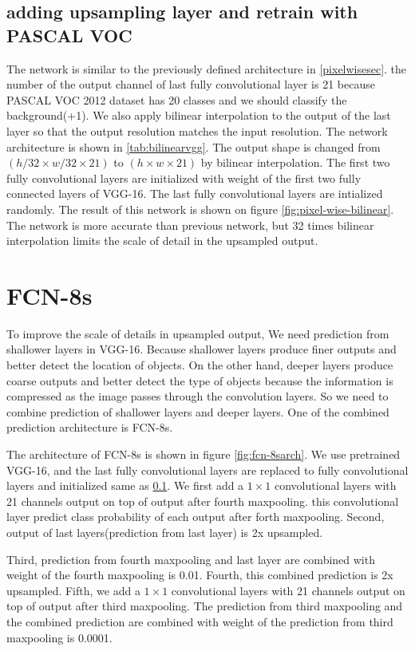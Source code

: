 \documentclass[extendedabs]{bmvc2k}
\begin{document}
\subsection{adding upsampling layer and retrain with PASCAL VOC} \label{addupsample}
The network is similar to the previously defined architecture in \ref{pixelwisesec}. the number of the output channel of last fully convolutional layer is 21 because PASCAL VOC 2012 dataset has 20 classes and we should classify the background(+1). We also apply bilinear interpolation to the output of the last layer so that the output resolution matches the input resolution. The network architecture is shown in \ref{tab:bilinearvgg}. The output shape is changed from $(h/32 \times w/32 \times 21)$ to $(h\times w\times 21)$ by bilinear interpolation. The first two fully convolutional layers are initialized with weight of the first two fully connected layers of VGG-16\cite{vggnet}. The last fully convolutional layers are intialized randomly. The result of this network is shown on figure \ref{fig:pixel-wise-bilinear}. The network is more accurate than previous network, but 32 times bilinear interpolation limits the scale of detail in the upsampled output.

\section{FCN-8s}
To improve the scale of details in upsampled output, We need prediction from shallower layers in VGG-16. Because shallower layers produce finer outputs and better detect the location of objects. On the other hand, deeper layers produce coarse outputs and better detect the type of objects because the information is compressed as the image passes through the convolution layers. So we need to combine prediction of shallower layers and deeper layers. One of the combined prediction architecture is FCN-8s.

The architecture of FCN-8s is shown in figure \ref{fig:fcn-8sarch}. We use pretrained VGG-16, and the last fully convolutional layers are replaced to fully convolutional layers and initialized same as \ref{addupsample}. We first add a $1\times1$ convolutional layers with 21 channels output on top of output after fourth maxpooling. this convolutional layer predict class probability of each output after forth maxpooling. Second, output of last layers(prediction from last layer) is 2x upsampled.

Third, prediction from fourth maxpooling and last layer are combined with weight of the fourth maxpooling is 0.01. Fourth, this combined prediction is 2x upsampled. Fifth, we add a $1\times1$ convolutional layers with 21 channels output on top of output after third maxpooling. The prediction from third maxpooling and the combined prediction are combined with weight of the prediction from third maxpooling is 0.0001.
\end{document}
